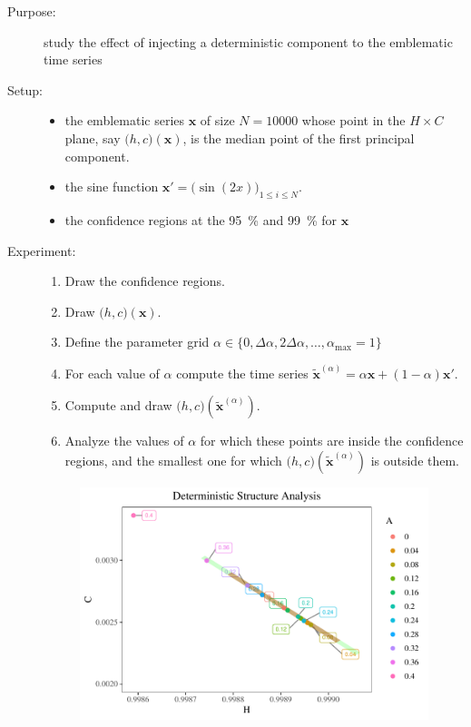 \documentclass[12pt]{article}
\begin{document}
\begin{description}
	\item[Purpose:] study the effect of injecting a deterministic component to the emblematic time series
	\item[Setup:]\mbox{} 
	\begin{itemize}
		\item the emblematic series $\bm x$ of size $N=\num{10000}$ whose point in the $H\times C$ plane, say $\big(h, c\big)(\bm x)$, is the median point of the first principal component.
		\item the sine function $\bm x'=\big(\sin(2x) \big)_{1\leq i\leq N}$.
		\item the confidence regions at the \SI{95}{\percent} and \SI{99}{\percent} for $\bm x$
	\end{itemize}
	\item[Experiment:] \mbox{}
	\begin{enumerate}
		\item Draw the confidence regions.
		\item Draw $\big(h,c\big)(\bm x)$.
		\item Define the parameter grid $\alpha\in\{0,\Delta \alpha, 2\Delta \alpha,\dots, \alpha_{\max} = 1\}$
		\item For each value of $\alpha$ compute the time series $\widetilde{\bm x}^{(\alpha)}=\alpha\bm x + (1-\alpha)\bm x'$.
		\item Compute and draw $\big(h,c\big)(\widetilde{\bm x}^{(\alpha)})$.
		\item Analyze the values of $\alpha$ for which these points are inside the confidence regions, and the smallest one for which $\big(h,c\big)(\widetilde{\bm x}^{(\alpha)})$ is outside them.
	\end{enumerate}
	
	\begin{figure}[H]
	\includegraphics[width=\linewidth]{../../Images/Deterministic-Analysis.pdf}
	\end{figure}

\end{description}
\end{document}
